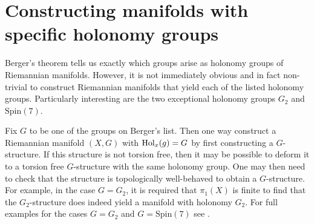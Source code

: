 \documentclass{article}
\begin{document}
\section{Constructing manifolds with specific holonomy groups}

Berger's theorem tells us exactly which groups arise as holonomy groups of
Riemannian manifolds. However, it is not immediately obvious and in fact
non-trivial to construct Riemannian manifolds that yield each of the listed
holonomy groups. Particularly interesting are the two exceptional
holonomy groups $G_2$ and $\text{Spin}(7)$.

Fix $G$ to be one of the groups on Berger's list. Then one way
construct a Riemannian manifold $(X,G)$ with $\operatorname{Hol}_x(g)=G$ by
first constructing a $G$-structure. If this structure is not torsion
free, then it may be possible to deform it to a torsion free $G$-structure
with the same holonomy group. One may then need to check
that the structure is topologically well-behaved to obtain a $G$-structure.
For example, in the case $G=G_2$, it is required that $\pi_1(X)$ is
finite to find that the $G_2$-structure does indeed yield a manifold
with holonomy $G_2$. For full examples for the cases $G=G_2$
and $G=\text{Spin}(7)$ see \cite{joyce2007}.

\printbibliography{}
\end{document}
